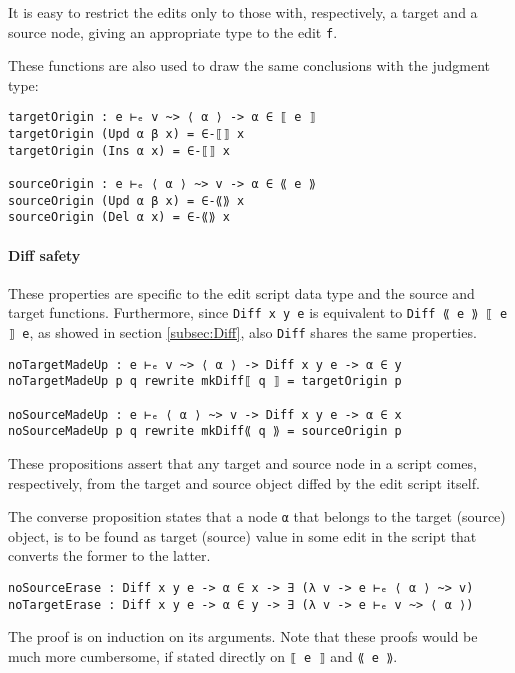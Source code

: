 \documentclass[../Thesis.tex]{subfiles}
\begin{document}
	It is easy to restrict the edits only to those with, respectively, a target and
	a source node, giving an appropriate type to the edit \texttt{f}.

	These functions are also used to draw the same conclusions with the 
	judgment type:
\begin{verbatim}
targetOrigin : e ⊢ₑ v ~> ⟨ α ⟩ -> α ∈ ⟦ e ⟧
targetOrigin (Upd α β x) = ∈-⟦⟧ x
targetOrigin (Ins α x) = ∈-⟦⟧ x

sourceOrigin : e ⊢ₑ ⟨ α ⟩ ~> v -> α ∈ ⟪ e ⟫
sourceOrigin (Upd α β x) = ∈-⟪⟫ x
sourceOrigin (Del α x) = ∈-⟪⟫ x
\end{verbatim}

	\paragraph{Diff safety}
	These properties are specific to the edit script data type and the source and 
	target functions.
	Furthermore, since \texttt{Diff x y e} is equivalent
	to \texttt{Diff ⟪ e ⟫ ⟦ e ⟧ e}, as showed in section \ref{subsec:Diff},
	also \texttt{Diff} shares the same properties.
	
\begin{verbatim}
noTargetMadeUp : e ⊢ₑ v ~> ⟨ α ⟩ -> Diff x y e -> α ∈ y 
noTargetMadeUp p q rewrite mkDiff⟦ q ⟧ = targetOrigin p

noSourceMadeUp : e ⊢ₑ ⟨ α ⟩ ~> v -> Diff x y e -> α ∈ x 
noSourceMadeUp p q rewrite mkDiff⟪ q ⟫ = sourceOrigin p
\end{verbatim}

	These propositions assert that any target and
	source node in a script comes, respectively, from the target and
	source object diffed by the edit script itself.
	
	The converse proposition states that a node \texttt{α} that belongs
	to the target (source) object, is to be found as target (source) value 
	in some edit in the script that converts the former to the latter.

\begin{verbatim}
noSourceErase : Diff x y e -> α ∈ x -> ∃ (λ v -> e ⊢ₑ ⟨ α ⟩ ~> v)
noTargetErase : Diff x y e -> α ∈ y -> ∃ (λ v -> e ⊢ₑ v ~> ⟨ α ⟩) 
\end{verbatim}

	The proof is on induction on its arguments. Note that these proofs
	would be much more cumbersome, if stated directly 
	on \texttt{⟦ e ⟧} and \texttt{⟪ e ⟫}.
	
\end{document}

